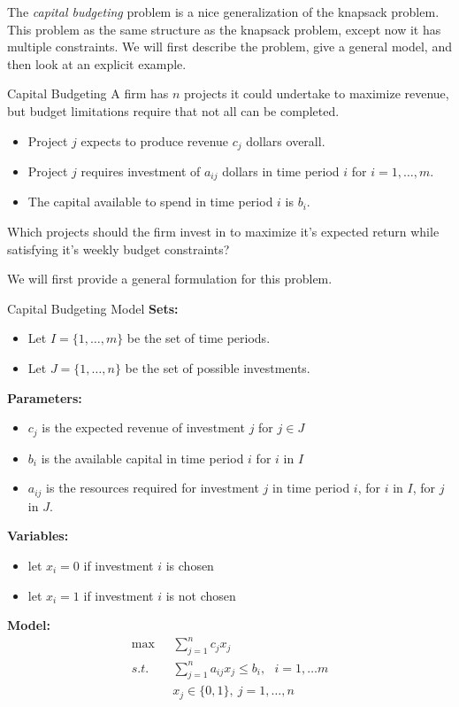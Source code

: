 
The \emph{capital budgeting} problem is a nice generalization of the knapsack problem.   This problem as the same structure as the knapsack problem, except now it has multiple constraints.   We will first describe the problem, give a general model, and then look at an explicit example.

\begin{general}{Capital Budgeting}{}
\label{general:capital-budgeting}
A firm has $n$ projects it could undertake to maximize revenue, but budget limitations require that not all can be completed.
\begin{itemize}
\item Project $j$ expects to produce revenue $c_j$ dollars overall.
\item Project $j$ requires investment of $a_{ij}$ dollars in time period $i$ for $i = 1,\ldots,m$.
\item The capital available to spend in time period $i$ is $b_i$.
\end{itemize}
Which projects should the firm invest in to maximize it's expected return while satisfying it's weekly budget constraints?
\end{general}

\newpage

We will first provide a general formulation for this problem.

\begin{general}{Capital Budgeting Model}{}
\noindent \textbf{Sets:}
\begin{itemize}
\item Let $I = \{1, \dots, m\}$ be the set of time periods.
\item Let $J = \{1, \dots, n\}$ be the set of possible investments.
\end{itemize}

\noindent \textbf{Parameters:}
\begin{itemize}
\item $c_j$ is the expected revenue of investment $j$ for $j \in J$
\item $b_i$ is the available capital in time period $i$ for $i$ in  $I$
\item $a_{ij}$ is the resources required for investment $j$ in time period $i$, for $i$ in $I$, for $j$ in $J$.
\end{itemize}

\noindent \textbf{Variables:}
\begin{itemize}
\item let $x_i = 0$ if investment $i$ is chosen
\item let $x_i = 1$ if investment $i$ is not chosen
\end{itemize}
\textbf{Model:}
\begin{align*}
	\max ~~~& \sum_{j = 1}^n c_jx_j \tag{Total Expected Revenue}\\
	s.t. ~~~&\sum_{j = 1}^n a_{ij}x_j\leq b_i, ~~~i = 1,\ldots m  \tag{ Resource constraint week $i$}\\
	& x_j \in \{0,1\} , \ j = 1,\ldots,n
	\end{align*}

\end{general}


